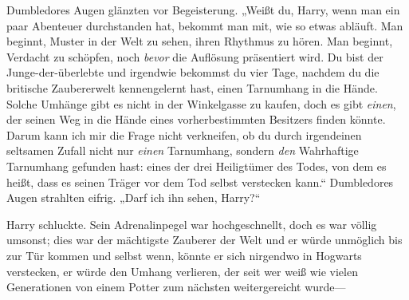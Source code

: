 Dumbledores Augen glänzten vor Begeisterung. „Weißt du, Harry, wenn man ein paar Abenteuer durchstanden hat, bekommt man mit, wie so etwas abläuft. Man beginnt, Muster in der Welt zu sehen, ihren Rhythmus zu hören. Man beginnt, Verdacht zu schöpfen, noch \emph{bevor} die Auflösung präsentiert wird. Du bist der Junge-der-überlebte und irgendwie bekommst du vier Tage, nachdem du die britische Zaubererwelt kennengelernt hast, einen Tarnumhang in die Hände. Solche Umhänge gibt es nicht in der Winkelgasse zu kaufen, doch es gibt \emph{einen}, der seinen Weg in die Hände eines vorherbestimmten Besitzers finden könnte. Darum kann ich mir die Frage nicht verkneifen, ob du durch irgendeinen seltsamen Zufall nicht nur \emph{einen} Tarnumhang, sondern \emph{den} Wahrhaftige Tarnumhang gefunden hast: eines der drei Heiligtümer des Todes, von dem es heißt, dass es seinen Träger vor dem Tod selbst verstecken kann.“ Dumbledores Augen strahlten eifrig. „Darf ich ihn sehen, Harry?“

Harry schluckte. Sein Adrenalinpegel war hochgeschnellt, doch es war völlig umsonst; dies war der mächtigste Zauberer der Welt und er würde unmöglich bis zur Tür kommen und selbst wenn, könnte er sich nirgendwo in Hogwarts verstecken, er würde den Umhang verlieren, der seit wer weiß wie vielen Generationen von einem Potter zum nächsten weitergereicht wurde—

